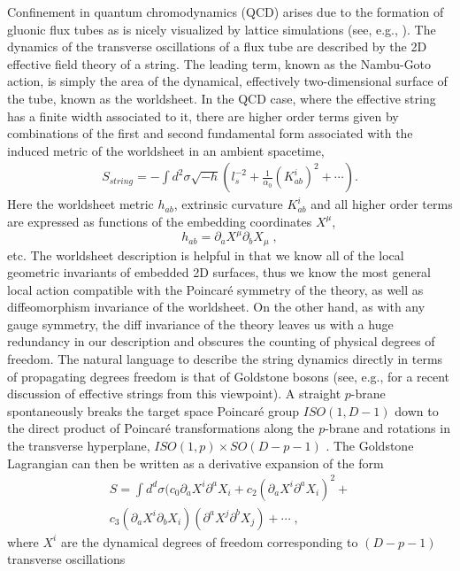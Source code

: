\documentclass[%
 reprint,
 amsmath,amssymb,
 aps,
]{revtex4-1}
\begin{document}
Confinement in quantum chromodynamics (QCD) arises due to the formation of
gluonic flux tubes as is nicely visualized by lattice simulations (see, e.g.,  \cite{Bissey:2006bz}).
The dynamics of the transverse oscillations of a flux tube are
described by the 2D effective field theory of a string. The leading term, known as the
Nambu-Goto action, is simply the area of the dynamical, effectively two-dimensional surface
of the tube, known as the worldsheet. In the QCD case, where the effective string has a finite
width associated to it, there are higher order terms given by combinations of the first
and second fundamental form associated with the induced metric
 of the worldsheet in an
ambient spacetime,
\begin{eqnarray}
\label{diffaction}
    S_{string} = - \int d^2 \sigma \sqrt{- h} \left(
    l_s^{-2} + \frac{1}{\alpha_0} (K^i_{ab})^2 + \cdots \right).
\end{eqnarray}
Here the worldsheet metric $h_{ab}$, extrinsic curvature $K^i_{ab}$ and all higher order terms are expressed as functions of the embedding coordinates $X^\mu$,
\[
h_{ab}=\partial_a X^\mu\partial_bX_\mu\;,
\]
etc.
The worldsheet description is helpful in that we know all
of the local geometric invariants of embedded 2D surfaces, thus we know the most general
local action compatible with the Poincar\'e symmetry of the theory, as
well as diffeomorphism invariance of the worldsheet. On the other hand, as with any gauge symmetry, the
diff invariance of the theory leaves us with a huge redundancy in our description and obscures the counting of physical degrees of freedom.
 The natural language to describe the string dynamics directly in terms of propagating degrees freedom  is that of Goldstone bosons
 (see, e.g., \cite{Dubovsky:2012sh} for a recent discussion of effective strings from this viewpoint).
 A  straight $p$-brane spontaneously breaks the target space Poincar\'e group $ISO(1,D-1)$ down to the direct product of Poincar\'e
 transformations along the $p$-brane and rotations in the transverse hyperplane,
  $ISO(1,p)\times SO(D-p-1)$ . The Goldstone Lagrangian can then be written
as a derivative expansion of the form
\begin{eqnarray}
\label{action}
    S =  \int d^d \sigma (c_0 \partial_a X^i \partial^a X_i +
    c_2 (\partial_a X^i \partial^a X_i)^2 +  \\
    c_3 (\partial_a X^i \partial_b X_i)(\partial^a X^j \partial^b X_j) + \cdots \; , \nonumber
\end{eqnarray}
where $X^i$ are
the dynamical degrees of freedom  corresponding to  $(D-p-1)$ transverse oscillations
\end{document}
